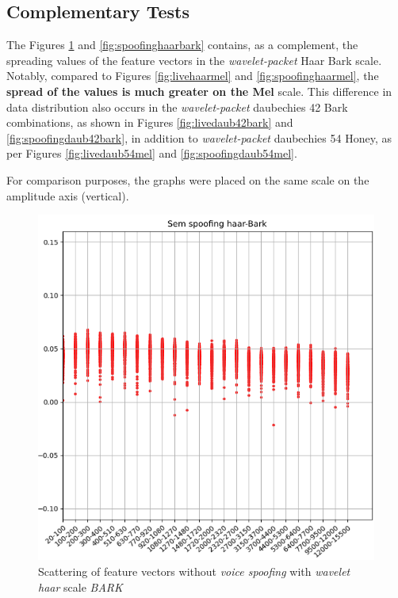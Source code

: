 		
	\subsection{Complementary Tests}
		\label{chap:testsResults:sec:Experimento05}
		
		\par The Figures \ref{fig:livehaarbark} and \ref{fig:spoofinghaarbark} contains, as a complement, the spreading values of the feature vectors in the \textit{wavelet-packet} Haar Bark scale. Notably, compared to Figures \ref{fig:livehaarmel} and \ref{fig:spoofinghaarmel}, the \textbf{spread of the values is much greater on the Mel} scale. This difference in data distribution also occurs in the \textit{wavelet-packet} daubechies 42 Bark combinations, as shown in Figures \ref{fig:livedaub42bark} and \ref{fig:spoofingdaub42bark}, in addition to \textit{wavelet-packet} daubechies 54 Honey, as per Figures \ref{fig:livedaub54mel} and \ref{fig:spoofingdaub54mel}.
		
		\par For comparison purposes, the graphs were placed on the same scale on the amplitude axis (vertical).
		
		\begin{figure}[!h]
			\centering
			\includegraphics[width=.70\linewidth, height=.68\linewidth]{images/results/barkVersusMel/liveHaarBark}
			\caption{Scattering of feature vectors without \textit{voice spoofing} with \textit{wavelet haar} scale \textit {BARK}}
			\label{fig:livehaarbark}
		\end{figure}
		

